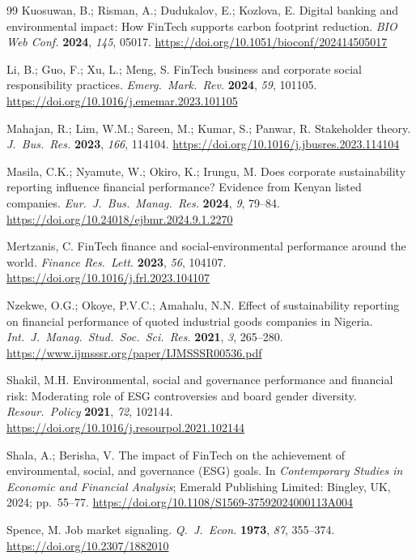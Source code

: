 \documentclass[12pt]{article}
\begin{document}
\begin{thebibliography}{99}
Kuosuwan, B.; Risman, A.; Dudukalov, E.; Kozlova, E. Digital banking and environmental impact: How FinTech supports carbon footprint reduction. \textit{BIO Web Conf.} \textbf{2024}, \textit{145}, 05017. \url{https://doi.org/10.1051/bioconf/202414505017}

Li, B.; Guo, F.; Xu, L.; Meng, S. FinTech business and corporate social responsibility practices. \textit{Emerg.\ Mark.\ Rev.} \textbf{2024}, \textit{59}, 101105. \url{https://doi.org/10.1016/j.ememar.2023.101105}

Mahajan, R.; Lim, W.M.; Sareen, M.; Kumar, S.; Panwar, R. Stakeholder theory. \textit{J.~Bus.\ Res.} \textbf{2023}, \textit{166}, 114104. \url{https://doi.org/10.1016/j.jbusres.2023.114104}

Masila, C.K.; Nyamute, W.; Okiro, K.; Irungu, M. Does corporate sustainability reporting influence financial performance? Evidence from Kenyan listed companies. \textit{Eur.~J.~Bus.\ Manag.\ Res.} \textbf{2024}, \textit{9}, 79--84. \url{https://doi.org/10.24018/ejbmr.2024.9.1.2270}

Mertzanis, C. FinTech finance and social-environmental performance around the world. \textit{Finance Res.\ Lett.} \textbf{2023}, \textit{56}, 104107. \url{https://doi.org/10.1016/j.frl.2023.104107}

Nzekwe, O.G.; Okoye, P.V.C.; Amahalu, N.N. Effect of sustainability reporting on financial performance of quoted industrial goods companies in Nigeria. \textit{Int.\ J.~Manag.\ Stud.\ Soc.\ Sci.\ Res.} \textbf{2021}, \textit{3}, 265--280. \url{https://www.ijmsssr.org/paper/IJMSSSR00536.pdf}

Shakil, M.H. Environmental, social and governance performance and financial risk: Moderating role of ESG controversies and board gender diversity. \textit{Resour.\ Policy} \textbf{2021}, \textit{72}, 102144. \url{https://doi.org/10.1016/j.resourpol.2021.102144}

Shala, A.; Berisha, V. The impact of FinTech on the achievement of environmental, social, and governance (ESG) goals. In \textit{Contemporary Studies in Economic and Financial Analysis}; Emerald Publishing Limited: Bingley, UK, 2024; pp.~55--77. \url{https://doi.org/10.1108/S1569-37592024000113A004}

Spence, M. Job market signaling. \textit{Q.~J.~Econ.} \textbf{1973}, \textit{87}, 355--374. \url{https://doi.org/10.2307/1882010}


\end{thebibliography}
\end{document}
